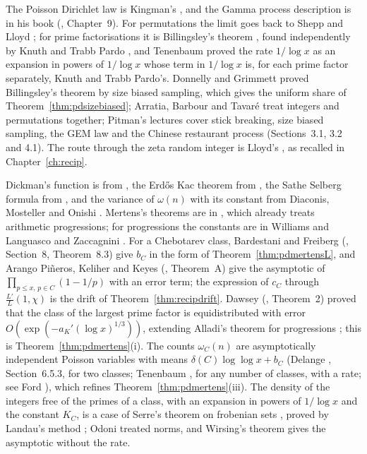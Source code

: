 The Poisson Dirichlet law is Kingman's \cite{kingman1975}, and the Gamma process description is in his book (\cite{kingman1993}, Chapter~9). For permutations the limit goes back to Shepp and Lloyd \cite{shepplloyd1966}; for prime factorisations it is Billingsley's theorem \cite{billingsley1972}, found independently by Knuth and Trabb Pardo \cite{knuthtrabbpardo1976}, and Tenenbaum \cite{tenenbaum2000} proved the rate $1/\log x$ as an expansion in powers of $1/\log x$ whose term in $1/\log x$ is, for each prime factor separately, Knuth and Trabb Pardo's. Donnelly and Grimmett \cite{donnellygrimmett1993} proved Billingsley's theorem by size biased sampling, which gives the uniform share of Theorem~\ref{thm:pdsizebiased}; Arratia, Barbour and Tavar\'e \cite{arratiabarbourtavare2003} treat integers and permutations together; Pitman's lectures \cite{pitman2006} cover stick breaking, size biased sampling, the GEM law and the Chinese restaurant process (Sections~3.1, 3.2 and 4.1). The route through the zeta random integer is Lloyd's \cite{lloyd1984}, as recalled in Chapter~\ref{ch:recip}.

Dickman's function is from \cite{dickman1930}, the Erd\H{o}s Kac theorem from \cite{erdoskac1940}, the Sathe Selberg formula from \cite{sathe1953,selberg1954}, and the variance of $\omega(n)$ with its constant from Diaconis, Mosteller and Onishi \cite{diaconismostelleronishi1977}. Mertens's theorems are in \cite{mertens1874}, which already treats arithmetic progressions; for progressions the constants are in Williams \cite{williams1974} and Languasco and Zaccagnini \cite{languascozaccagnini2007}. For a Chebotarev class, Bardestani and Freiberg (\cite{bardestanifreiberg2013}, Section~8, Theorem~8.3) give $b_C$ in the form of Theorem~\ref{thm:pdmertensL}, and Arango Pi\~neros, Keliher and Keyes (\cite{arangopinerokeliherkeyes2022}, Theorem~A) give the asymptotic of $\prod_{p\le x,\,p\in C}(1-1/p)$ with an error term; the expression of $c_C$ through $\frac{L'}L(1,\chi)$ is the drift of Theorem~\ref{thm:recipdrift}. Dawsey (\cite{dawsey2017}, Theorem~2) proved that the class of the largest prime factor is equidistributed with error $O(\exp(-a_K'(\log x)^{1/3}))$, extending Alladi's theorem for progressions \cite{alladi1977}; this is Theorem~\ref{thm:pdmertens}(i). The counts $\omega_C(n)$ are asymptotically independent Poisson variables with means $\delta(C)\log\log x+b_C$ (Delange \cite{delange1971}, Section~6.5.3, for two classes; Tenenbaum \cite{tenenbaum2017}, for any number of classes, with a rate; see Ford \cite{ford2022}), which refines Theorem~\ref{thm:pdmertens}(iii). The density of the integers free of the primes of a class, with an expansion in powers of $1/\log x$ and the constant $K_C$, is a case of Serre's theorem on frobenian sets \cite{serre1976}, proved by Landau's method \cite{landau1908}; Odoni \cite{odoni1975} treated norms, and Wirsing's theorem \cite{wirsing1961} gives the asymptotic without the rate.


